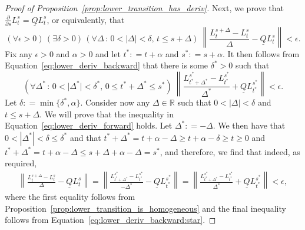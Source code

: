 \documentclass[10pt,a4paper]{paper}
\theoremstyle{definition}
\newcommand{\reals}{\mathbb{R}}
\newcommand{\realspos}{\reals_{>0}}
\newcommand{\lbound}{L}
\newcommand{\lrate}{\underline{Q}}
\newcommand{\norm}[1]{\left\lVert #1 \right\rVert}
\newcommand{\abs}[1]{\left\vert #1 \right\vert}
\newcommand{\coloneqq}{:\!=}
\begin{document}
\begin{proof}[Proof of Proposition~\ref{prop:lower_transition_has_deriv}]
Next, we prove that $\frac{\partial}{\partial s}L_t^s=\lrate L_t^s$, or equivalently, that
\begin{equation}\label{eq:lower_deriv_forward}
(\forall\epsilon>0)\,
(\exists\delta>0)\,
(\forall\Delta\,:\,0<\lvert\Delta\rvert<\delta,\,t\leq s+\Delta)~
\norm{\frac{L_{t}^{s+\Delta}-L_t^s}{\Delta}-\lrate\lbound_t^s }<\epsilon.
\end{equation}
Fix any $\epsilon>0$ and $\alpha>0$ and let $t^*\coloneqq t+\alpha$ and $s^*\coloneqq s+\alpha$. It then follows from Equation~\eqref{eq:lower_deriv_backward} that there is some $\delta^*>0$ such that
\begin{equation}\label{eq:lower_deriv_backward:star}
(\forall\Delta^*\,:\,0<\lvert\Delta^*\rvert <\delta^*,\,0\leq t^*+\Delta^*\leq s^*)~
\norm{\frac{L_{t^*+\Delta^*}^{s^*}-L_{t^*}^{s^*}}{\Delta^*}+\lrate L_{t^*}^{s^*}}<\epsilon.
\end{equation}
Let $\delta\coloneqq\min\{\delta^*,\alpha\}$. Consider now any $\Delta\in\reals$ such that $0<\abs{\Delta}<\delta$ and $t\leq s+\Delta$. We will prove that the inequality in Equation~\eqref{eq:lower_deriv_forward} holds. Let $\Delta^*\coloneqq-\Delta$. We then have that $0<\abs{\Delta^*}<\delta\leq\delta^*$ and that $t^*+\Delta^*=t+\alpha-\Delta\geq t+\alpha-\delta\geq t\geq 0$ and $t^*+\Delta^*=t+\alpha-\Delta\leq s+\Delta+\alpha-\Delta=s^*$, and therefore, we find that indeed, as required,
\begin{align*}
\norm{\frac{L_{t}^{s+\Delta}-L_t^s}{\Delta}-\lrate\lbound_t^s}
= \norm{\frac{L_{t^*+\Delta^*}^{s^*}-L_{t^*}^{s^*}}{-\Delta^*}-\lrate\lbound_{t^*}^{s^*}}
= \norm{\frac{L_{t^*+\Delta^*}^{s^*}-L_{t^*}^{s^*}}{\Delta^*}+\lrate\lbound_{t^*}^{s^*}}<\epsilon,
\end{align*}
where the first equality follows from Proposition~\ref{prop:lower_transition_is_homogeneous} and the final inequality follows from Equation~\eqref{eq:lower_deriv_backward:star}.

\end{proof}
\end{document}
